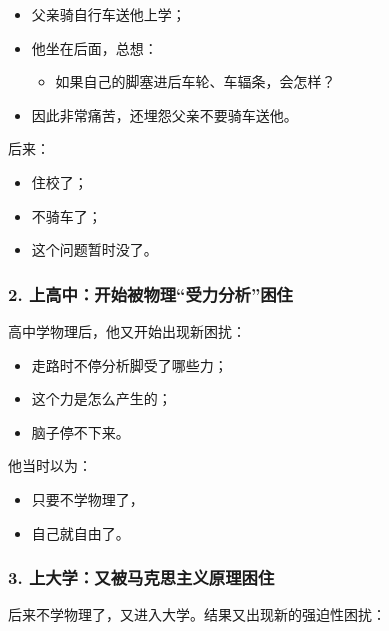 \documentclass[
  chinese,
  9pt,
  a4paper,
]{ctexart}
\providecommand{\tightlist}{%
  \setlength{\itemsep}{0pt}\setlength{\parskip}{0pt}}
\begin{document}
\begin{itemize}
\item
  父亲骑自行车送他上学；
\item
  他坐在后面，总想：

  \begin{itemize}
  \tightlist
  \item
    如果自己的脚塞进后车轮、车辐条，会怎样？
  \end{itemize}
\item
  因此非常痛苦，还埋怨父亲不要骑车送他。
\end{itemize}

后来：

\begin{itemize}
\tightlist
\item
  住校了；
\item
  不骑车了；
\item
  这个问题暂时没了。
\end{itemize}

\subsubsection{2.
上高中：开始被物理``受力分析''困住}\label{ux4e0aux9ad8ux4e2dux5f00ux59cbux88abux7269ux7406ux53d7ux529bux5206ux6790ux56f0ux4f4f}

高中学物理后，他又开始出现新困扰：

\begin{itemize}
\tightlist
\item
  走路时不停分析脚受了哪些力；
\item
  这个力是怎么产生的；
\item
  脑子停不下来。
\end{itemize}

他当时以为：

\begin{itemize}
\tightlist
\item
  只要不学物理了，
\item
  自己就自由了。
\end{itemize}

\subsubsection{3.
上大学：又被马克思主义原理困住}\label{ux4e0aux5927ux5b66ux53c8ux88abux9a6cux514bux601dux4e3bux4e49ux539fux7406ux56f0ux4f4f}

后来不学物理了，又进入大学。结果又出现新的强迫性困扰：
\end{document}
